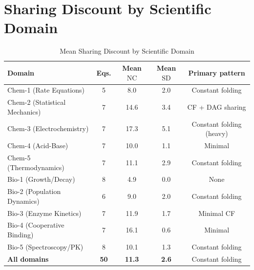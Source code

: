 \documentclass[12pt,a4paper]{article}
\theoremstyle{definition}
\newcommand{\NC}{\mathrm{NC}}
\newcommand{\SD}{\mathrm{SD}}
\begin{document}
\section{Sharing Discount by Scientific Domain}
\label{sec:bydomain}

\begin{table}[ht]
\centering
\caption{Mean Sharing Discount by Scientific Domain}
\label{tab:bydomain}
\begin{tabular}{lcccc}
\toprule
\textbf{Domain} & \textbf{Eqs.} & \textbf{Mean $\NC$} & \textbf{Mean $\SD$} & \textbf{Primary pattern} \\
\midrule
Chem-1 (Rate Equations)       & 5  & 8.0  & 2.0 & Constant folding \\
Chem-2 (Statistical Mechanics)& 7  & 14.6 & 3.4 & CF + DAG sharing \\
Chem-3 (Electrochemistry)     & 7  & 17.3 & 5.1 & Constant folding (heavy) \\
Chem-4 (Acid-Base)            & 7  & 10.0 & 1.1 & Minimal \\
Chem-5 (Thermodynamics)       & 7  & 11.1 & 2.9 & Constant folding \\
\midrule
Bio-1 (Growth/Decay)          & 8  & 4.9  & 0.0 & None \\
Bio-2 (Population Dynamics)   & 6  & 9.0  & 2.0 & Constant folding \\
Bio-3 (Enzyme Kinetics)       & 7  & 11.9 & 1.7 & Minimal CF \\
Bio-4 (Cooperative Binding)   & 7  & 16.1 & 0.6 & Minimal \\
Bio-5 (Spectroscopy/PK)       & 8  & 10.1 & 1.3 & Constant folding \\
\midrule
\textbf{All domains}          & \textbf{50} & \textbf{11.3} & \textbf{2.6} & Constant folding \\
\bottomrule
\end{tabular}
\end{table}
\end{document}
